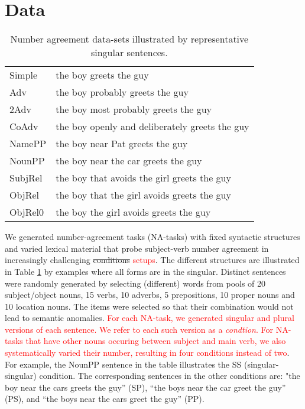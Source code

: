 \section{Data}

\begin{table}[tb]
  \centering
  \begin{footnotesize}
  \begin{tabular}{l@{\hskip1pt}l}
    \B Simple & the boy greets the guy\\
    \B Adv & the boy probably greets the guy\\
    \B 2Adv & the boy most probably greets the guy\\
    \B CoAdv &  the boy openly and deliberately greets the guy\\
    \B NamePP & the boy near Pat greets the guy\\
    \B NounPP & the boy near the car greets the guy\\
    \B SubjRel & the boy that avoids the girl greets the guy\\
    \B ObjRel  & the boy that the girl avoids greets the guy \\
    \B ObjRel0 &  the boy the girl avoids greets the guy\\
  \end{tabular}
  \end{footnotesize}
  \caption{Number agreement data-sets illustrated by representative
    singular sentences.}
  \label{tab:data-sets}
\end{table}

We generated number-agreement tasks (NA-tasks) with fixed syntactic structures and varied
lexical material that probe subject-verb number agreement in
increasingly challenging \sout{conditions} \textcolor{red}{setups}. The different structures are
illustrated in Table \ref{tab:data-sets} by examples where all forms
are in the singular. Distinct sentences were randomly generated by
selecting (different) words from pools of 20 subject/object nouns, 15
verbs, 10 adverbs, 5 prepositions, 10 proper nouns and 10 location
nouns. The items were selected so that their combination would not
lead to semantic anomalies. \textcolor{red}{For each NA-task, we generated singular and plural
versions of each sentence. We refer to each such version as a \textit{condtion}. For NA-tasks that have other nouns occuring between
subject and main verb, we also systematically varied their number, resulting in four conditions instead of two}. For example, the
NounPP sentence in the table illustrates the SS (singular-singular)
condition. The corresponding sentences in the other conditions are:
"the boy near the cars greets the guy'' (SP), ``the boys near the car
greet the guy'' (PS), and ``the boys near the cars greet the guy''
(PP). 


